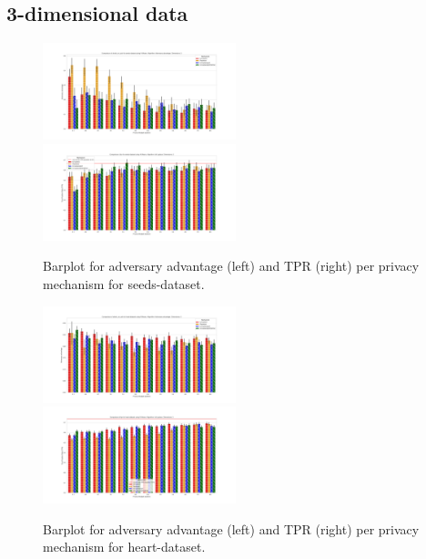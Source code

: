 \subsection{3-dimensional data}
\begin{figure}[H]
    \centering
    \begin{minipage}[c]{1.1\textwidth}
        \includegraphics[width=0.50\textwidth]{Results/RQ2/seeds-dataset/shokri_mi_adv_seeds-dataset_comparison.png}
        \includegraphics[width=0.50\textwidth]{Results/RQ2/seeds-dataset/tpr_seeds-dataset_comparison.png}
        \caption{Barplot for adversary advantage (left) and TPR (right) per privacy mechanism for seeds-dataset.}
        \label{fig:privacy_seeds-dataset_comparison_3d_aa_plot}
    \end{minipage}
    \begin{minipage}[c]{1.1\textwidth}
        \includegraphics[width=0.50\textwidth]{Results/RQ2/heart-dataset/shokri_mi_adv_heart-dataset_comparison.png}
        \includegraphics[width=0.50\textwidth]{Results/RQ2/heart-dataset/tpr_heart-dataset_comparison.png}
        \caption{Barplot for adversary advantage (left) and TPR (right) per privacy mechanism for heart-dataset.}
        \label{fig:privacy_heart-dataset_comparison_3d_aa_plot}
    \end{minipage}
\end{figure}
